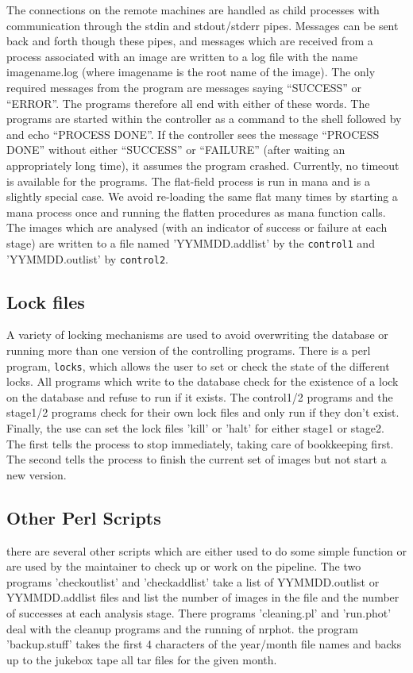 \documentclass{article}
\begin{document}
The connections on the remote machines are handled as child processes
with communication through the stdin and stdout/stderr pipes.
Messages can be sent back and forth though these pipes, and messages
which are received from a process associated with an image are written
to a log file with the name imagename.log (where imagename is the root
name of the image).  The only required messages from the program are
messages saying ``SUCCESS'' or ``ERROR''.  The programs therefore all
end with either of these words.  The programs are started within the
controller as a command to the shell followed by and echo ``PROCESS
DONE''.  If the controller sees the message ``PROCESS DONE'' without
either ``SUCCESS'' or ``FAILURE'' (after waiting an appropriately long
time), it assumes the program crashed.  Currently, no timeout is
available for the programs.  The flat-field process is run in mana and
is a slightly special case.  We avoid re-loading the same flat many
times by starting a mana process once and running the flatten
procedures as mana function calls.  The images which are analysed
(with an indicator of success or failure at each stage) are written to
a file named 'YYMMDD.addlist' by the {\tt control1} and 'YYMMDD.outlist'
by {\tt control2}.

\subsection{Lock files}

A variety of locking mechanisms are used to avoid overwriting the
database or running more than one version of the controlling
programs.  There is a perl program, {\tt locks}, which allows the user to
set or check the state of the different locks. All programs which
write to the database check for the existence of a lock on the
database and refuse to run if it exists.  The control1/2 programs and the
stage1/2 programs check for their own lock files and only run if they
don't exist.  Finally, the use can set the lock files 'kill' or 'halt'
for either stage1 or stage2.  The first tells the process to stop
immediately, taking care of bookkeeping first.  The second tells the
process to finish the current set of images but not start a new
version.  

\subsection{Other Perl Scripts} 

there are several other scripts which are either used to do some
simple function or are used by the maintainer to check up or work on
the pipeline.  The two programs 'checkoutlist' and 'checkaddlist' take
a list of YYMMDD.outlist or YYMMDD.addlist files and list the number
of images in the file and the number of successes at each analysis
stage.  There programs 'cleaning.pl' and 'run.phot' deal with the
cleanup programs and the running of nrphot.  the program
'backup.stuff' takes the first 4 characters of the year/month file
names and backs up to the jukebox tape all tar files for the given
month.
\end{document}

